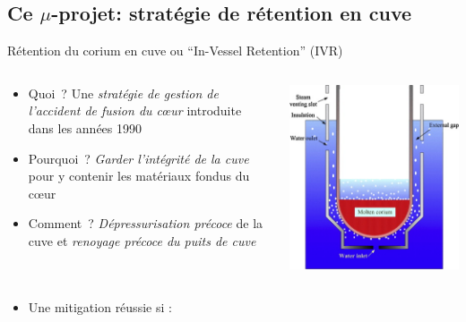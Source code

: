 \subsection{Ce $\mu$-projet: stratégie de rétention en cuve}
\begin{frame}[fragile]
Rétention du corium en cuve ou ``In-Vessel Retention'' (IVR)
\begin{columns}
\begin{column}{0.7\textwidth}
\begin{itemize}
\item Quoi~? Une \emph{stratégie de gestion de l'accident de fusion du c\oe ur} introduite dans les années 1990 \cite{Henry1993,Tuomisto1994}
\item Pourquoi~? \emph{Garder l'intégrité de la cuve} pour y contenir les matériaux fondus du c\oe ur
\item Comment~? \emph{Dépressurisation précoce} de la cuve et \emph{renoyage précoce du puits de cuve} 
\end{itemize}
\end{column}
\begin{column}{0.3\textwidth}
\centering \includegraphics[height=0.5\textheight]{Figures/ivr.jpg}
\end{column}
\end{columns}
\begin{itemize}
\item Une mitigation réussie si :
\begin{itemize}

\end{itemize}
\end{itemize}
\end{frame}
